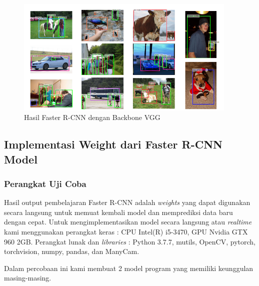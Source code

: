\documentclass{article}
\begin{document}
   	\begin{figure}[H]
   		\centering
   		\includegraphics[width=400px]{arsitektur/contoh_hasil.png}
   		\caption{Hasil Faster R-CNN dengan Backbone VGG}
   	\end{figure}
   	
   	\newpage
  	\subsection{Implementasi Weight dari Faster R-CNN Model}
  	\subsubsection{Perangkat Uji Coba}
	\par Hasil output pembelajaran Faster R-CNN adalah \textit{weights} yang dapat digunakan secara langsung untuk memuat kembali model dan memprediksi data baru dengan cepat. Untuk mengimplementasikan model secara langsung atau \textit{realtime} kami menggunakan perangkat keras : CPU Intel(R) i5-3470, GPU Nvidia GTX 960 2GB. Perangkat lunak dan \textit{libraries} : Python 3.7.7, mutils, OpenCV, pytorch, torchvision, numpy, pandas, dan ManyCam. 
	
	\par Dalam percobaan ini kami membuat 2 model program yang memiliki keunggulan masing-masing.
\end{document}
